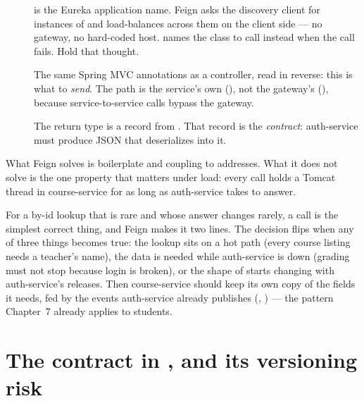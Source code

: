 \begin{description}
  \item[]  is the Eureka application name. Feign asks
  the discovery client for instances of  and
  load-balances across them on the client side --- no gateway, no
  hard-coded host.  names the class to call instead when
  the call fails. Hold that thought.
  \item[] The same Spring MVC annotations as a controller, read in
  reverse: this is what to \emph{send}. The path is the service's own
  (), not the gateway's (),
  because service-to-service calls bypass the gateway.
  \item[] The return type is a record from . That
  record is the \emph{contract}: auth-service must produce JSON that
  deserializes into it.
\end{description}

What Feign solves is boilerplate and coupling to addresses. What it does
not solve is the one property that matters under load: every call
holds a Tomcat thread in course-service for as long as auth-service
takes to answer.

\begin{decision}
For a by-id lookup that is rare and whose answer changes rarely, a call
is the simplest correct thing, and Feign makes it two lines. The
decision flips when any of three things becomes true: the lookup sits
on a hot path (every course listing needs a teacher's name), the data
is needed while auth-service is down (grading must not stop because
login is broken), or the shape of  starts changing with
auth-service's releases. Then course-service should keep its own copy
of the fields it needs, fed by the events auth-service already
publishes (, ) --- the
pattern Chapter~7 already applies to students.
\end{decision}

\section{The contract in , and its versioning risk}

